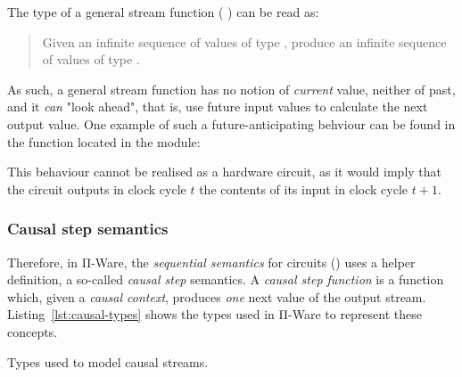             The type of a general stream function (    )
            can be read as:

            \begin{quote}
                Given an infinite sequence of values of type ,
                produce an infinite sequence of values of type .
            \end{quote}

            As such, a general stream function has no notion of \emph{current} value, neither of past,
            and it \emph{can} "look ahead", that is, use future input values to calculate the next output value.
            One example of such a future-anticipating behviour can be found in the  function
            located in the  module:

            \begin{center}
            \end{center}

            This behaviour cannot be realised as a hardware circuit, as it would imply that the
            circuit outputs in clock cycle $t$ the contents of its input in clock cycle $t+1$.


            \subsubsection{Causal step semantics}
            \label{subsubsec:causal-step-semantics}
            Therefore, in Π-Ware, the \emph{sequential semantics} for circuits () uses a
            helper definition, a so-called \emph{causal step} semantics.
            A \emph{causal step function} is a function which, given a \emph{causal context},
            produces \emph{one} next value of the output stream.
            Listing~\ref{lst:causal-types} shows the types used in Π-Ware to represent these concepts.

            \begin{listing}[h]
                \newline
                \caption{Types used to model causal streams.\label{lst:causal-types}}
            \end{listing}

